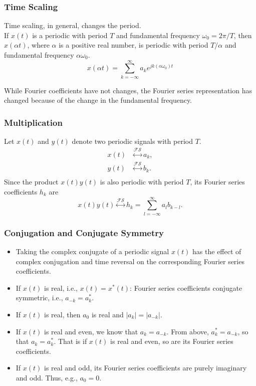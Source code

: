 \begin{frame}[plain]\frametitle{Time Scaling}
    Time scaling, in general, changes the period.\\
    If $x(t)$ is a periodic with period $T$ and fundamental frequency $\omega_0 = 2\pi/T$, then $x(\alpha t)$, where $\alpha$ is a positive real number, is periodic with period $T/\alpha$ and fundamental frequency $\alpha \omega_0$.
    \begin{equation}
        x(\alpha t) = \sum_{k=-\infty}^{\infty} a_k e^{jk(\alpha \omega_0)t}
    \end{equation}
    {

        While Fourier coefficients have not changes, the Fourier series representation \alert{has} changed because of the change in the fundamental frequency.

    }
\end{frame}


\begin{frame}[plain]\frametitle{Multiplication}
    {
        Let $x(t)$ and $y(t)$ denote two periodic signals with period $T$.
        \begin{align*}
            x(t) &\overset{\mathcal{FS}}{\longleftrightarrow} a_k,\\
            y(t) &\overset{\mathcal{FS}}{\longleftrightarrow} b_k.\\
        \end{align*}
        Since the product $x(t)y(t)$ is also periodic with period $T$, its Fourier series coefficients $h_k$ are
        \begin{equation}
            x(t)y(t) \overset{\mathcal{FS}}{\longleftrightarrow} h_k = \sum_{l=-\infty}^{\infty}a_l b_{k-l}.
        \end{equation}

    }
\end{frame}


\begin{frame}[plain]\frametitle{Conjugation and Conjugate Symmetry}
    {

        \begin{itemize}[<+->]
          \item Taking the complex conjugate of a periodic signal $x(t)$ has the effect of complex conjugation and \alert{time reversal} on the corresponding Fourier series coefficients.
          \item If $x(t)$ is real, i.e., $x(t) = x^\ast(t)$: Fourier series coefficients conjugate symmetric, i.e., $a_{-k} = a^\ast_k$.
          \item If $x(t)$ is real, then $a_0$ is real and $|a_k| = |a_{-k}|$.
          \item If $x(t)$ is real and even, we know that $a_k = a_{-k}$. From above, $a^\ast_k = a_{-k}$, so that $a_{k} = a^\ast_k$. That is if $x(t)$ is real and even, so are its Fourier series coefficients.
          \item If $x(t)$ is real and odd, its Fourier series coefficients are purely imaginary and odd. Thus, e.g., $a_0 = 0$.%
        \end{itemize}
    }
\end{frame}


